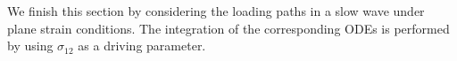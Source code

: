 We finish this section by considering the loading paths in a slow wave under plane strain conditions.
The integration of the corresponding ODEs is performed by using $\sigma_{12}$ as a driving parameter.

